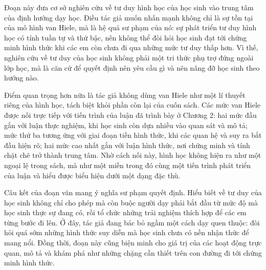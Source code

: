 \documentclass[
  10pt,
  a4paper,
  landscape,
  twoside,
  openany
]{scrbook}
\newcommand{\NOTE}[1]{#1}
\begin{document}
{
\NOTE{Đoạn này đưa cơ sở nghiên cứu về tư duy hình học của học sinh vào trung tâm của định hướng dạy học. Điều tác giả muốn nhấn mạnh không chỉ là sự tồn tại của mô hình van Hiele, mà là hệ quả sư phạm của nó: sự phát triển tư duy hình học có tính tuần tự và thứ bậc, nên không thể đòi hỏi học sinh đạt tới chứng minh hình thức khi các em còn chưa đi qua những mức tư duy thấp hơn. Vì thế, nghiên cứu về tư duy của học sinh không phải một tri thức phụ trợ đứng ngoài lớp học, mà là căn cứ để quyết định nên yêu cầu gì và nên nâng đỡ học sinh theo hướng nào.

Điểm quan trọng hơn nữa là tác giả không dùng van Hiele như một lí thuyết riêng của hình học, tách biệt khỏi phần còn lại của cuốn sách. Các mức van Hiele được nối trực tiếp với tiến trình của luận đã trình bày ở Chương 2: hai mức đầu gắn với luận thực nghiệm, khi học sinh còn dựa nhiều vào quan sát và mô tả; mức thứ ba tương ứng với giai đoạn tiền hình thức, khi các quan hệ và suy ra bắt đầu hiện rõ; hai mức cao nhất gắn với luận hình thức, nơi chứng minh và tính chặt chẽ trở thành trung tâm. Nhờ cách nối này, hình học không hiện ra như một ngoại lệ trong sách, mà như một miền trong đó cùng một tiến trình phát triển của luận và hiểu được biểu hiện dưới một dạng đặc thù.

Câu kết của đoạn văn mang ý nghĩa sư phạm quyết định. Hiểu biết về tư duy của học sinh không chỉ cho phép mà còn buộc người dạy phải bắt đầu từ mức độ mà học sinh thực sự đang có, rồi tổ chức những trải nghiệm thích hợp để các em từng bước đi lên. Ở đây, tác giả đang bác bỏ ngầm một cách dạy quen thuộc: đòi hỏi quá sớm những hình thức suy diễn mà học sinh chưa có nền nhận thức để mang nổi. Đồng thời, đoạn này cũng biện minh cho giá trị của các hoạt động trực quan, mô tả và khám phá như những chặng cần thiết trên con đường đi tới chứng minh hình thức.}
}
\end{document}
